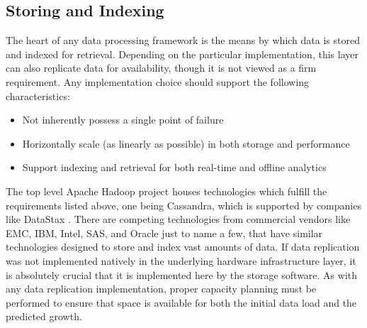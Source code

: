 \subsection{Storing and Indexing}
 The heart of any data processing framework is the means by which data is stored and indexed for retrieval. Depending on the particular implementation, this layer can also replicate data for availability, though it is not viewed as a firm requirement. Any implementation choice should support the following characteristics:
\begin{itemize}
	\item Not inherently possess a single point of failure
	\item Horizontally scale (as linearly as possible) in both storage and performance
	\item Support indexing and retrieval for both real-time and offline analytics
\end{itemize}
The top level Apache Hadoop project houses technologies which fulfill the requirements listed above, one being Cassandra, which is supported by companies like DataStax \cite{cassandra}. There are competing technologies from commercial vendors like EMC, IBM, Intel, SAS, and Oracle just to name a few, that have similar technologies designed to store and index vast amounts of data. If data replication was not implemented natively in the underlying hardware infrastructure layer, it is absolutely crucial that it is implemented here by the storage software. As with any data replication implementation, proper capacity planning must be performed to ensure that space is available for both the initial data load and the predicted growth.\\

